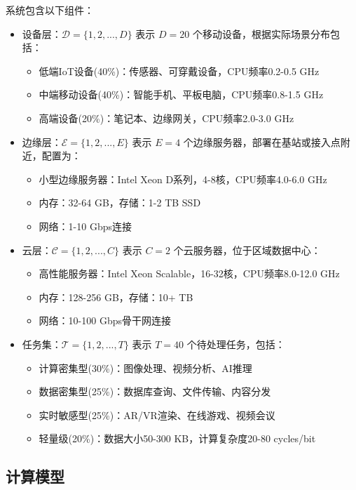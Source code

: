 \documentclass[conference]{IEEEtran}
\begin{document}
系统包含以下组件：
\begin{itemize}
    \item 设备层：$\mathcal{D} = \{1, 2, ..., D\}$ 表示 $D = 20$ 个移动设备，根据实际场景分布包括：
        \begin{itemize}
            \item 低端IoT设备(40\%)：传感器、可穿戴设备，CPU频率0.2-0.5 GHz
            \item 中端移动设备(40\%)：智能手机、平板电脑，CPU频率0.8-1.5 GHz
            \item 高端设备(20\%)：笔记本、边缘网关，CPU频率2.0-3.0 GHz
        \end{itemize}
    \item 边缘层：$\mathcal{E} = \{1, 2, ..., E\}$ 表示 $E = 4$ 个边缘服务器，部署在基站或接入点附近，配置为：
        \begin{itemize}
            \item 小型边缘服务器：Intel Xeon D系列，4-8核，CPU频率4.0-6.0 GHz
            \item 内存：32-64 GB，存储：1-2 TB SSD
            \item 网络：1-10 Gbps连接
        \end{itemize}
    \item 云层：$\mathcal{C} = \{1, 2, ..., C\}$ 表示 $C = 2$ 个云服务器，位于区域数据中心：
        \begin{itemize}
            \item 高性能服务器：Intel Xeon Scalable，16-32核，CPU频率8.0-12.0 GHz
            \item 内存：128-256 GB，存储：10+ TB
            \item 网络：10-100 Gbps骨干网连接
        \end{itemize}
    \item 任务集：$\mathcal{T} = \{1, 2, ..., T\}$ 表示 $T = 40$ 个待处理任务，包括：
        \begin{itemize}
            \item 计算密集型(30\%)：图像处理、视频分析、AI推理
            \item 数据密集型(25\%)：数据库查询、文件传输、内容分发
            \item 实时敏感型(25\%)：AR/VR渲染、在线游戏、视频会议
            \item 轻量级(20\%)：数据大小50-300 KB，计算复杂度20-80 cycles/bit
        \end{itemize}
\end{itemize}

\subsection{计算模型}
\end{document}
